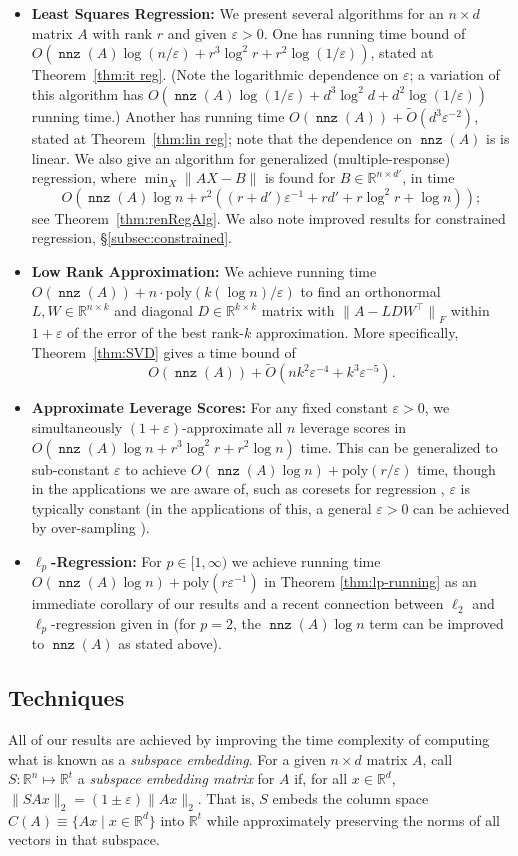 \documentclass{sig-alternate}
\newcommand{\norm}[1]{{\| #1 \|}}
\DeclareMathOperator{\nnz}{\mathtt{nnz}}
\newcommand\tO{\tilde{O}}
\newcommand{\poly}{{\mathrm{poly}}}
\newcommand{\eps}{\varepsilon}
\newcommand{\R}{{\mathbb R}}
\begin{document}
\begin{itemize}
\item {\bf Least Squares Regression:} We present several algorithms 
for an $n \times d$ matrix $A$ with rank $r$ and given
$\eps > 0$. One 
has running time bound of
$O(\nnz(A)\log (n/\eps) + r^3 \log^2 r + r^2\log(1/\eps))$,
stated at Theorem~\ref{thm:it reg}. (Note the logarithmic dependence on $\eps$;
a variation of this algorithm has $O(\nnz(A)\log(1/\eps)+ d^3 \log^2 d + d^2\log(1/\eps))$
running time.)
Another has 
running time $O(\nnz(A)) + \tO(d^3 \eps^{-2})$, stated at
Theorem~\ref{thm:lin reg}; note that the dependence on $\nnz(A)$ is
is linear.
We also give an algorithm for generalized (multiple-response)
regression, where $\min_X \norm{AX-B}$ is found for $B\in\R^{n\times d'}$,
in time 
\[
O(\nnz(A)\log n + r^2((r+d')\eps^{-1} + rd' + r\log^2 r + \log n));
\]
see Theorem~\ref{thm:renRegAlg}.
We also note improved results for constrained regression,
\S\ref{subsec:constrained}.
\item {\bf Low Rank Approximation:}
We achieve running time
$O(\nnz(A)) + n \cdot \poly(k(\log n)/\eps)$
to find an orthonormal $L,W\in\R^{n\times k}$ and diagonal $D\in\R^{k\times k}$ matrix
with $\norm{A-LDW^\top}_F$ within $1+\eps$ of the error of the best rank-$k$
approximation. More specifically,
Theorem~\ref{thm:SVD} gives a time bound
of
\[
O(\nnz(A)) + \tilde O(nk^2\eps^{-4} + k^3\eps^{-5}).
\]
\item {\bf Approximate Leverage Scores:} For any fixed constant $\eps > 0$, we simultaneously
$(1+\eps)$-approximate all $n$ leverage scores in 
$O(\nnz(A) \log n + r^3 \log^2 r + r^2 \log n)$ time. 
This can be generalized to sub-constant $\eps$ to achieve $O(\nnz(A) \log n) + \poly(r/\eps)$ time, 
though in the applications we are aware of, such
as coresets for regression \cite{ddhkm09}, $\eps$ is typically constant 
(in the applications of this, a general $\eps > 0$ can be achieved
by over-sampling \cite{dmm06,ddhkm09}).
\item {\bf $\ell_p$-Regression:}
For $p \in [1,\infty)$
we achieve
running time $O(\nnz(A) \log n) + \poly(r \eps^{-1})$
in 
Theorem \ref{thm:lp-running} as an immediate corollary of our results and a recent connection between 
$\ell_2$ and $\ell_p$-regression given in \cite{CDMMMW}
(for $p = 2$, the $\nnz(A) \log n$ term can be improved to $\nnz(A)$ as 
stated above).
\end{itemize}
\subsection{Techniques}
All of our results are achieved by improving the time complexity of computing what is known 
as a {\it subspace embedding}. For a given $n\times d$ matrix $A$, call $S:\R^n\mapsto\R^t$
a \emph{subspace embedding matrix} for $A$ if, for all $x\in\R^d$, $\|SAx\|_2 = (1 \pm \eps) \|Ax\|_2$.
That is, $S$ embeds the column space $C(A)\equiv \{Ax \mid x\in \R^d\}$ into $\R^t$
while approximately preserving the norms of all vectors in that subspace.
\end{document}
